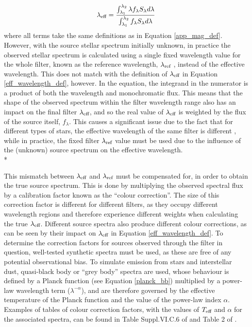 \documentclass[12pt, a4paper]{report}
\begin{document}
\begin{equation}
\lambda_{\textnormal{eff}} = \frac{ \int_{\lambda_{1}}^{\lambda_{2}} \lambda f_{\lambda} S_{\lambda} d\lambda }{ \int_{\lambda_{1}}^{\lambda_{2}} f_{\lambda} S_{\lambda} d\lambda }
\label{eff_wavelength_def}
\end{equation}
where all terms take the same definitions as in Equation \ref{app_mag_def}. However, with the source stellar spectrum initially unknown, in practice the observed stellar spectrum is calculated using a single fixed wavelength value for the whole filter, known as the reference wavelength, $\lambda_{\textnormal{ref}}$ \citep{2006A&A...447..769P}, instead of the effective wavelength. This does not match with the definition of $\lambda_{\textnormal{eff}}$ in Equation \ref{eff_wavelength_def}, however. In the equation, the integrand in the numerator is a product of both the wavelength and monochromatic flux. This means that the shape of the observed spectrum within the filter wavelength range also has an impact on the final filter $\lambda_{\textnormal{eff}}$, and so the real value of $\lambda_{\textnormal{eff}}$ is weighted by the flux of the source itself, $f_{\lambda}$. This causes a significant issue due to the fact that for different types of stars, the effective wavelength of the same filter is different \citep{1988iras....1.....B}, while in practice, the fixed filter $\lambda_{\textnormal{ref}}$ value must be used due to the influence of the (unknown) source spectrum on the effective wavelength.\\*

This mismatch between $\lambda_{\textnormal{eff}}$ and $\lambda_{\textnormal{ref}}$ must be compensated for, in order to obtain the true source spectrum. This is done by multiplying the observed spectral flux by a calibration factor known as the ``colour correction''. The size of this correction factor is different for different filters, as they occupy different wavelength regions and therefore experience different weights when calculating the true $\lambda_{\textnormal{eff}}$. Different source spectra also produce different colour corrections, as can be seen by their impact on $\lambda_{\textnormal{eff}}$ in Equation \ref{eff_wavelength_def}. To determine the correction factors for sources observed through the filter in question, well-tested synthetic spectra must be used, as these are free of any potential observational bias. To simulate emission from stars and interstellar dust, quasi-black body or ``grey body'' spectra are used, whose behaviour is defined by a Planck function (see Equation \ref{planck_bb}) multiplied by a power-law wavelength term ($\lambda^{-\alpha}$), and are therefore governed by the effective temperature of the Planck function and the value of the power-law index $\alpha$. Examples of tables of colour correction factors, with the values of $T_{\textnormal{eff}}$ and $\alpha$ for the associated spectra, can be found in Table Suppl.VI.C.6 of \cite{1988iras....1.....B} and Table 2 of \cite{2006A&A...447..769P}.
\end{document}
